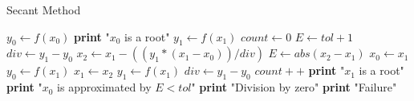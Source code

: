 \documentclass{article}
\begin{document}
  \begin{algorithm}
    \caption{Secant Method}
    \begin{algorithmic}[1]
        \State $y_{0} \gets f(x_{0})$
          \State \textbf{print} "$x_{0}$ is a root"
        \Else
          \State $y_{1} \gets f(x_{1})$
          \State $count \gets 0$
          \State $E \gets tol + 1$
          \State $div \gets y_{1} - y_{0}$
            \State $x_{2} \gets x_{1} - ((y_{1} * (x_{1} - x_{0})) / div)$
            \State $E \gets abs(x_{2} - x_{1})$
            \State $x_{0} \gets x_{1}$
            \State $y_{0} \gets f(x_{1})$
            \State $x_{1} \gets x_{2}$
            \State $y_{1} \gets f(x_{1})$
            \State $div \gets y_{1} - y_{0}$
            \State $count++$
          \EndWhile
            \State \textbf{print} "$x_{1}$ is a root"
            \State \textbf{print} "$x_{0}$ is approximated by $E < tol$"
            \State \textbf{print} "Division by zero"
          \Else
            \State \textbf{print} "Failure"
          \EndIf
        \EndIf
      \EndProcedure
    \end{algorithmic}
  \end{algorithm}
\end{document}
